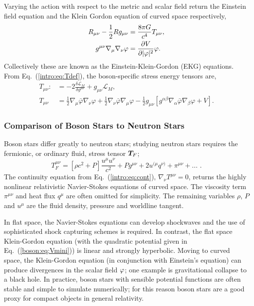 Varying the action with respect to the metric and scalar field return the Einstein field equation and the Klein Gordon equation of curved space respectively,
\begin{align} R_{\mu\nu} - \frac{1}{2}R g_{\mu\nu} &=  \frac{8\pi G}{c^4} T_{\mu\nu}  ,\\
g^{\mu\nu}\nabla_\mu\nabla_\nu \varphi &= \frac{\partial V}{\partial |\varphi|^2}\varphi .\label{boson:eq:KGeqn}\end{align}
Collectively these are known as the Einstein-Klein-Gordon (EKG) equations. From Eq.~(\ref{intro:eq:Tdef}), the boson-specific stress energy tensors are,
\begin{align}
T_{\mu\nu} :&= -2\frac{\delta \mathcal{L}_{M}}{\delta g^{\mu\nu}}+g_{\mu\nu}\mathcal{L}_M, \\
T_{\mu\nu} &= \frac{1}{2}\nabla_{\mu}\bar{\varphi}\nabla_{\nu}\varphi+\frac{1}{2}\nabla_{\nu}\bar{\varphi}\nabla_{\mu}\varphi-\frac{1}{2}g_{\mu\nu}\left[g^{\alpha\beta}\nabla_\alpha\bar{\varphi}\nabla_\beta\varphi + V\right] \label{boson:eq:KGT}.
\end{align}


\subsubsection{Comparison of Boson Stars to Neutron Stars}
Boson stars differ greatly to neutron stars; studying neutron stars requires the
fermionic, or ordinary fluid, stress tensor $\boldsymbol{T}_F$;
\begin{equation} T^{\mu\nu}_F = \left[\rho c^2+ {P} \right]\frac{u^\mu u^\nu}{c^2}
+ P g^{\mu\nu} + 2u^{(\mu}q^{\nu)}+\pi^{\mu\nu}+ ...\,\,.\end{equation}
The continuity equation from Eq.~(\ref{intro:eq:cont}), $\nabla_\nu T^{\mu\nu}=0 $,
returns the highly nonlinear relativistic Navier-Stokes equations of curved space.
The viscosity term $\pi^{\mu\nu}$ and heat flux $q^\mu$ are often omitted for simplicity.
The remaining variables $\rho$, $P$ and $u^\mu$ are the fluid density, pressure and
worldline tangent.

\color{orchid}
In flat space, the Navier-Stokes equations can develop
shockwaves and the use of sophisticated shock capturing schemes is required. In
contrast, the flat space Klein-Gordon equation (with the quadratic potential given
in Eq.~(\ref{boson:eq:Vmini})) is linear and strongly hyperbolic. Moving to curved space,
the Klein-Gordon equation (in conjunction with Einstein's equation) can produce
divergences in the scalar field $\varphi$; one example is gravitational collapse to a
black hole. In practice, boson stars with sensible potential functions are
often stable and simple to simulate numerically; for this reason boson stars
are a good proxy for compact objects in general relativity. \color{black}


